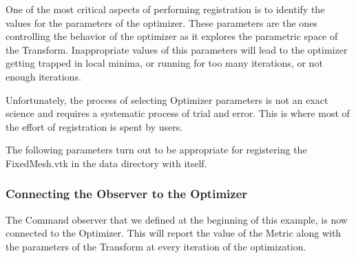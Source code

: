 \documentclass{InsightArticle}
\begin{document}
One of the most critical aspects of performing registration is to identify the
values for the parameters of the optimizer. These parameters are the ones
controlling the behavior of the optimizer as it explores the parametric space
of the Transform. Inappropriate values of this parameters will lead to the
optimizer getting trapped in local minima, or running for too many iterations,
or not enough iterations.

Unfortunately, the process of selecting Optimizer parameters is not an exact
science and requires a systematic process of trial and error. This is where
most of the effort of registration is spent by users.

The following parameters turn out to be appropriate for registering the
FixedMesh.vtk in the data directory with itself.

\begin{center}

\end{center}



\subsubsection{Connecting the Observer to the Optimizer}

The Command observer that we defined at the beginning of this example, is now
connected to the Optimizer.  This will report the value of the Metric along
with the parameters of the Transform at every iteration of the optimization.

\begin{center}

\end{center}



%
%



\end{document}
